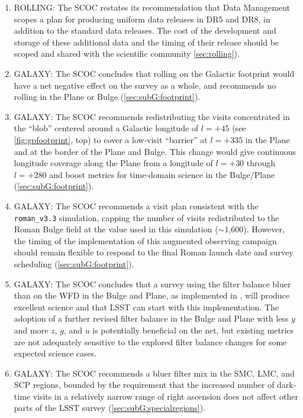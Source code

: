 \begin{enumerate}
\item  ROLLING: The SCOC restates its recommendation that Data Management scopes a plan for producing uniform data releases in DR5 and DR8, in addition to the standard data releases. The cost of the development and storage of these additional data and the timing of their release should be scoped and shared with the scientific community \autoref{sec:rolling}).

\item  GALAXY: The SCOC concludes that rolling on the Galactic footprint would have a net negative effect on the survey as a whole, and recommends no rolling in the Plane or Bulge (\autoref{sec:subG:footprint}).


\item  GALAXY: The SCOC recommends redistributing the visits concentrated in the ``blob'' centered around a Galactic longitude of $l=+45$ (see \autoref{fig:gpfootprint}, top) to cover a low-visit ``barrier'' at $l=+335$ in the Plane and at the border of the Plane and Bulge. This change would give continuous longitude coverage along the Plane from a longitude of $l=+30$  through $l=+280$ and boost metrics for time-domain science in the Bulge/Plane (\autoref{sec:subG:footprint}).

\item  GALAXY: The SCOC recommends a visit plan consistent with the \texttt{roman\_v3.3} simulation, capping the number of visits redistributed to the Roman Bulge field at the value used in this simulation (\mbox{$\sim$1,600}). However, the timing of the implementation of this augmented observing campaign should remain flexible to respond to the final Roman launch date and survey scheduling (\autoref{sec:subG:footprint}).

\item  GALAXY: The SCOC concludes that a survey using the filter balance bluer than on the WFD in the Bulge and Plane, as implemented in , will produce excellent science and that LSST can start with this implementation. The adoption of a further revised filter balance in the Bulge and Plane with less $y$ and more $z$, $g$, and $u$ is potentially beneficial on the net, but existing metrics are not adequately sensitive to the explored filter balance changes for some expected science cases. 

\item  GALAXY: The SCOC recommends a bluer filter mix in the SMC, LMC, and SCP regions, bounded by the requirement that the increased number of dark-time visits in a relatively narrow range of right ascension does not affect other parts of the LSST survey (\autoref{sec:subG:specialregions}).


\end{enumerate}
